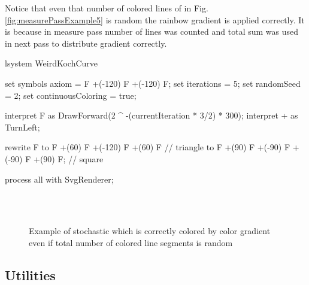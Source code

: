 Notice that even that number of colored lines of \lsystem in Fig. \ref{fig:measurePassExample5} is random the rainbow gradient is applied correctly.
It is because in measure pass number of lines was counted and total sum was used in next pass to distribute gradient correctly.



\begin{Lsystem}[label=lsys:measurePassExample,caption={Stochastic \lsystem with variable number of line segments}]
lsystem WeirdKochCurve {
	set symbols axiom = F +(-120) F +(-120) F;
	set iterations = 5;
	set randomSeed = 2;
	set continuousColoring = true;

	interpret F as DrawForward(2 ^ -(currentIteration * 3/2) * 300);
	interpret + as TurnLeft;

	rewrite F
		to F +(60) F     +(-120)     F +(60) F  // triangle
		to F +(90) F +(-90) F +(-90) F +(90) F; // square
}
process all with SvgRenderer;
\end{Lsystem}

\begin{figure}[p]
	\centering
	 ~
	 ~
	 ~
	\\
	 ~
	 ~
	\\
	\caption{Example of stochastic \lsystem which is correctly colored by color gradient even if total number of colored line segments is random}
	\label{fig:measurePassExample}
\end{figure}

\subsection{Utilities}

